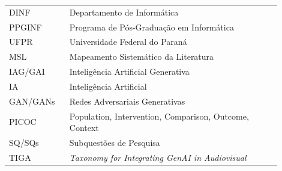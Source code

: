 

\begin{listaacron}

    \begin{longtable}[l]{p{0.2\linewidth}p{0.7\linewidth}}
    DINF & Departamento de Informática\\
    PPGINF & Programa de Pós-Graduação em Informática\\
    UFPR & Universidade Federal do Paraná\\
    MSL & Mapeamento Sistemático da Literatura\\
    IAG/GAI&Inteligência Artificial Generativa\\
    IA&Inteligência Artificial\\
    GAN/GANs&Redes Adversariais Generativas\\
    PICOC&Population, Intervention, Comparison, Outcome, Context\\
    SQ/SQs&Subquestões de Pesquisa\\
    TIGA&\textit{Taxonomy for Integrating GenAI in Audiovisual}\\
    \end{longtable}
    
    \end{listaacron}
    
    